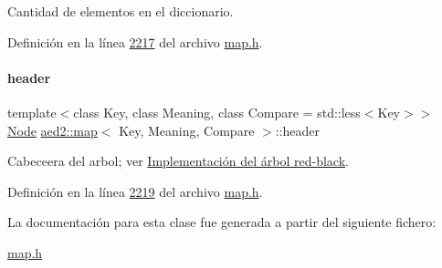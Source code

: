 Cantidad de elementos en el diccionario. 



Definición en la línea \hyperlink{map_8h_source_l02217}{2217} del archivo \hyperlink{map_8h_source}{map.\+h}.

\mbox{\label{classaed2_1_1map_a92d93f905c8ad73fba18fdc7e8915cce_a92d93f905c8ad73fba18fdc7e8915cce}} 
\paragraph{\texorpdfstring{header}{header}}
{\footnotesize\ttfamily template$<$class Key, class Meaning, class Compare = std\+::less$<$\+Key$>$$>$ \\
\hyperlink{structaed2_1_1map_1_1Node}{Node} \hyperlink{classaed2_1_1map}{aed2\+::map}$<$ Key, Meaning, Compare $>$\+::header\hspace{0.3cm}{\ttfamily [private]}}



Cabeceera del arbol; ver \hyperlink{Implementacion}{Implementación del árbol red-\/black}. 



Definición en la línea \hyperlink{map_8h_source_l02219}{2219} del archivo \hyperlink{map_8h_source}{map.\+h}.



La documentación para esta clase fue generada a partir del siguiente fichero\+:\begin{DoxyCompactItemize}
\item 
\hyperlink{map_8h}{map.\+h}\end{DoxyCompactItemize}
